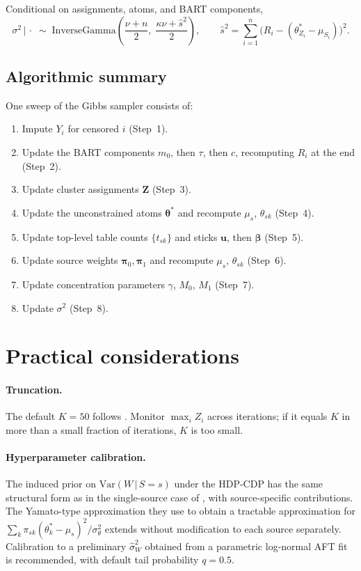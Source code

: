 \documentclass[11pt]{article}
\newcommand{\given}{\,|\,}
\newcommand{\Var}{\mathrm{Var}}
\newcommand{\1}{\mathbf{1}}
\begin{document}
Conditional on assignments, atoms, and BART components,
\begin{equation}
\sigma^2 \given \cdot \;\sim\; \mathrm{InverseGamma}\!\left(\frac{\nu + n}{2},\; \frac{\kappa\nu + \hat s^2}{2}\right), \qquad \hat s^2 = \sum_{i=1}^n \big(R_i - (\theta_{Z_i}^* - \mu_{S_i})\big)^2.
\end{equation}

\subsection{Algorithmic summary}

One sweep of the Gibbs sampler consists of:
\begin{enumerate}[label=(\arabic*), noitemsep]
\item Impute $Y_i$ for censored $i$ (Step~1).
\item Update the BART components $m_0$, then $\tau$, then $c$, recomputing $R_i$ at the end (Step~2).
\item Update cluster assignments $\bm{Z}$ (Step~3).
\item Update the unconstrained atoms $\bm{\theta}^*$ and recompute $\mu_s$, $\theta_{sk}$ (Step~4).
\item Update top-level table counts $\{t_{sk}\}$ and sticks $\bm{u}$, then $\bm{\beta}$ (Step~5).
\item Update source weights $\bm{\pi}_0, \bm{\pi}_1$ and recompute $\mu_s$, $\theta_{sk}$ (Step~6).
\item Update concentration parameters $\gamma$, $M_0$, $M_1$ (Step~7).
\item Update $\sigma^2$ (Step~8).
\end{enumerate}

\section{Practical considerations}\label{sec:practical-considerations}

\paragraph{Truncation.} The default $K = 50$ follows \citet{henderson2020individualized}. Monitor $\max_i Z_i$ across iterations; if it equals $K$ in more than a small fraction of iterations, $K$ is too small.

\paragraph{Hyperparameter calibration.} The induced prior on $\Var(W \given S = s)$ under the HDP-CDP has the same structural form as in the single-source case of \citet{henderson2020individualized}, with source-specific contributions. The Yamato-type approximation \citep{yamato1984characteristic} they use to obtain a tractable approximation for $\sum_k \pi_{sk}(\theta_k^* - \mu_s)^2 / \sigma_\theta^2$ extends without modification to each source separately. Calibration to a preliminary $\hat\sigma_W^2$ obtained from a parametric log-normal AFT fit is recommended, with default tail probability $q = 0.5$.
\end{document}

